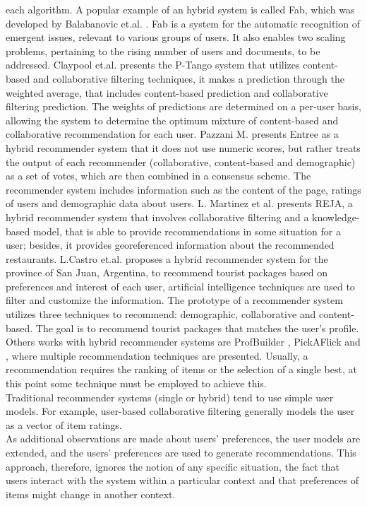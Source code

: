 each algorithm.
A popular example of an hybrid system is called Fab, which was
developed by  Balabanovic et.al. \cite{balabanovic1997fab}. Fab is a
system  for the automatic recognition of emergent issues, relevant to
various  groups of users. It also enables two scaling problems,
pertaining to the rising number of users and documents, to be
addressed.  Claypool et.al. \cite{claypool1999combining}  presents the
P-Tango system that utilizes content-based and collaborative filtering
techniques, it makes a prediction through the weighted average, that
includes content-based prediction and collaborative filtering
prediction. The weights of predictions are determined on a per-user
basis, allowing the system to determine the optimum mixture of
content-based and collaborative recommendation for each user. Pazzani
M. \cite{pazzani1999framework} presents Entree as a hybrid recommender
system that it does not use numeric scores, but rather treats the
output of each recommender (collaborative, content-based and
demographic) as a set of votes, which are then combined in a consensus
scheme. The recommender system includes information such as the
content of the page, ratings of users and demographic data about
users.
L. Martinez et al. \cite{martinez2009reja} presents REJA, a hybrid
recommender system that involves collaborative filtering and a
knowledge-based model, that is able to provide recommendations in some
situation for a user; besides, it provides georeferenced information
about the recommended restaurants.
L.Castro et.al. \cite{castro2012prototype} proposes  
a hybrid recommender system for the province of San Juan, Argentina, 
to recommend tourist packages  based on preferences and interest 
of each user, artificial intelligence
techniques are used to filter and customize the information. The
prototype of a recommender system utilizes three techniques to
recommend: demographic, collaborative and content-based. The goal is
to recommend tourist packages that matches the user's profile.
Others works with hybrid recommender systems are ProfBuilder
  \cite{al1999semantic}, PickAFlick \cite{burke1999integrating}  and
  \cite{tran2000hybrid}, where multiple recommendation
techniques are presented. Usually, a recommendation requires the ranking of
items or the selection of a single best, at this point some
technique must be employed to achieve this. \\ 
Traditional recommender systems (single or hybrid) tend to use
simple user models. For example, user-based collaborative filtering
generally models the user as a vector of item ratings. \\ As additional
observations are made about users' preferences, the user models are
extended, and the users' preferences are used to generate
recommendations. This approach, therefore, ignores the notion of any
specific situation, the fact that users interact with the system
within a particular context and  that preferences of items might 
change in another context. 

